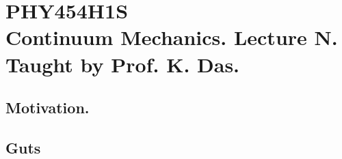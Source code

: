 
%

\chapter{PHY454H1S\\Continuum Mechanics.  Lecture N.  Taught by Prof. K. Das.}
\label{chap:continuumLN}
{}
\date{Jan XX, 2012}

\beginArtWithToc

\section{Motivation.}

\section{Guts}

\EndArticle
